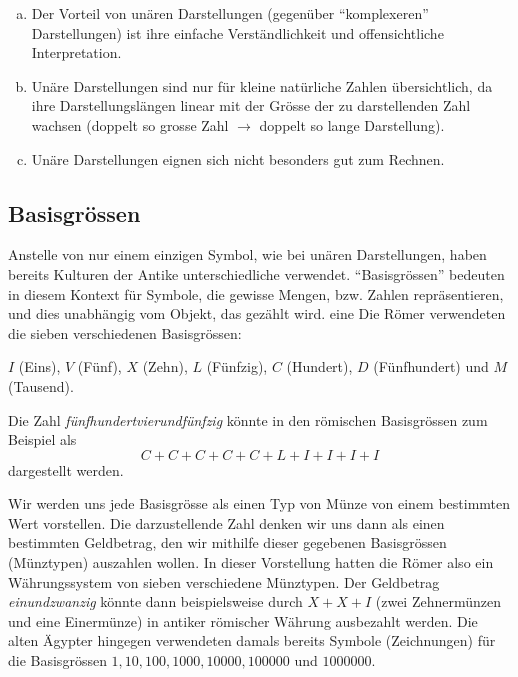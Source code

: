 \begin{myremark}\phantom{1}
  \begin{enumerate}[(a)]
    \item Der Vorteil von unären Darstellungen (gegenüber \enquote{komplexeren} Darstellungen) ist ihre einfache Verständlichkeit und
offensichtliche Interpretation.
    \item Unäre Darstellungen sind nur für kleine natürliche Zahlen übersichtlich, da ihre Darstellungslängen linear mit der Grösse der zu
darstellenden Zahl wachsen (doppelt so grosse Zahl $\rightarrow$ doppelt so lange Darstellung).
    \item Unäre Darstellungen eignen sich nicht besonders gut zum Rechnen. %
    \end{enumerate} 
\end{myremark}

\subsection{Basisgrössen}\label{subsection:Basisgroessen}
Anstelle von nur einem einzigen Symbol, wie bei unären Darstellungen, haben bereits Kulturen der Antike unterschiedliche
 verwendet. ``Basisgrössen'' bedeuten in diesem Kontext für Symbole, die gewisse Mengen, bzw. Zahlen repräsentieren, und dies unabhängig vom Objekt, das gezählt wird. eine Die Römer verwendeten die sieben verschiedenen Basisgrössen:
\begin{center}
  $I$ (Eins), $V$ (Fünf), $X$ (Zehn), $L$ (Fünfzig), $C$ (Hundert), $D$ (Fünfhundert) und $M$ (Tausend). 
\end{center}
\begin{myexample}\label{myexample:roman}
  Die Zahl \textit{fünfhundertvierundfünfzig} könnte in den römischen Basisgrössen zum Beispiel als
  \begin{equation*}
    C + C + C + C + C + L + I + I + I + I
  \end{equation*}
  dargestellt werden. 
\end{myexample}
Wir werden uns jede Basisgrösse als einen Typ von Münze von einem bestimmten Wert vorstellen. Die darzustellende Zahl
denken wir uns dann als einen bestimmten Geldbetrag, den wir mithilfe dieser gegebenen Basisgrössen (Münztypen) auszahlen wollen. In
dieser Vorstellung hatten die Römer also ein Währungssystem von sieben verschiedene Münztypen. Der Geldbetrag \textit{einundzwanzig} könnte
dann beispielsweise durch $X + X + I$ (zwei Zehnermünzen und eine Einermünze) in antiker römischer Währung ausbezahlt werden. Die alten Ägypter hingegen verwendeten damals bereits Symbole (Zeichnungen) für die Basisgrössen $1, 10, 100, 1000, 10000,
100000$ und $1000000$.

